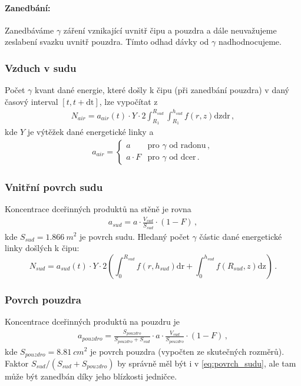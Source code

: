 \documentclass[11pt,a4paper]{article}
\begin{document}
\paragraph{Zanedbání:} Zanedbáváme $\gamma$ záření vznikající uvnitř čipu a pouzdra a dále neuvažujeme zeslabení svazku uvnitř pouzdra. Tímto odhad dávky od $\gamma$ nadhodnocujeme.
\subsubsection{Vzduch v sudu}
Počet $\gamma$ kvant dané energie, které došly k čipu (při zanedbání pouzdra) v daný časový interval $[t,t+\mathrm{dt}]$, lze vypočítat z
\begin{align}
	N_{air}=a_{air}(t)\cdot Y\cdot 2\int_{R_1}^{R_{sud}}\int_{R_1}^{h_{sud}}f(r,z)\mathrm{dz}\mathrm{dr}\,,
\end{align}
kde $Y$ je výtěžek dané energetické linky a
\begin{align}
a_{air}=\begin{cases}
a & \text{pro $\gamma$ od radonu}\,,\\
a\cdot F & \text{pro $\gamma$ od dcer}\,.
\end{cases}
\end{align}
\subsubsection{Vnitřní povrch sudu}
Koncentrace dceřinných produktů na stěně je rovna
\begin{align}
a_{sud}=a\cdot \frac{V_{sud}}{S_{sud}}\cdot (1-F)\,,\label{eq:povrch_sudu}
\end{align}
kde $S_{sud}=\SI{1,866}{m^2}$ je povrch sudu. Hledaný počet $\gamma$ částic dané energetické linky došlých k čipu:
\begin{equation}
N_{sud}=a_{sud}(t) \cdot Y\cdot 2\left(\int_{0}^{R_{sud}}f(r,h_{sud})\mathrm{dr}+\int_{0}^{h_{sud}}f(R_{sud},z)\mathrm{dz}\right)\,.
\end{equation}
\subsubsection{Povrch pouzdra}
Koncentrace dceřinných produktů na pouzdru je
\begin{align}
a_{pouzdro}=\frac{S_{pouzdro}}{S_{pouzdro}+S_{sud}}\cdot a\cdot \frac{V_{sud}}{S_{pouzdro}}\cdot (1-F)\,,
\end{align}
kde $S_{pouzdro}=\SI{8,81}{cm^2}$ je povrch pouzdra (vypočten ze skutečných rozměrů). Faktor $S_{sud}/(S_{sud}+S_{pouzdro})$ by správně měl být i v \eqref{eq:povrch_sudu}, ale tam může být zanedbán díky jeho blízkosti jedničce.
\end{document}
